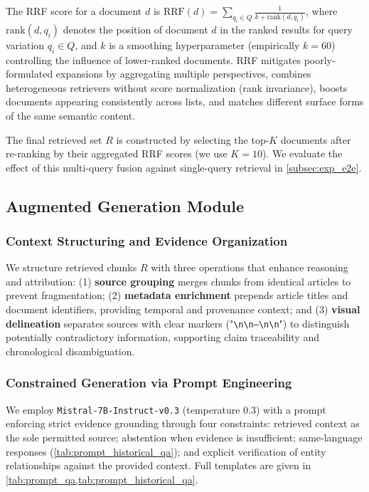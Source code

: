 \documentclass[11pt]{article}
\begin{document}
The RRF score for a document \(d\) is \(\text{RRF}(d) = \sum_{q_i \in Q} \frac{1}{k + \text{rank}(d, q_i)}\), where \(\text{rank}(d, q_i)\) denotes the position of document \(d\) in the ranked results for query variation \(q_i \in Q\), and \(k\) is a smoothing hyperparameter (empirically \(k = 60\)) controlling the influence of lower-ranked documents. RRF mitigates poorly-formulated expansions by aggregating multiple perspectives, combines heterogeneous retrievers without score normalization (rank invariance), boosts documents appearing consistently across lists, and matches different surface forms of the same semantic content.

The final retrieved set \(R\) is constructed by selecting the top-\(K\) documents after re-ranking by their aggregated RRF scores (we use \(K=10\)). We evaluate the effect of this multi-query fusion against single-query retrieval in \cref{subsec:exp_e2e}.

\subsection{Augmented Generation Module}
\label{subsec:generation}

\subsubsection{Context Structuring and Evidence Organization}
We structure retrieved chunks \(R\) with three operations that enhance reasoning and attribution: (1) \textbf{source grouping} merges chunks from identical articles to prevent fragmentation; (2) \textbf{metadata enrichment} prepends article titles and document identifiers, providing temporal and provenance context; and (3) \textbf{visual delineation} separates sources with clear markers ("\texttt{\textbackslash n\textbackslash n---\textbackslash n\textbackslash n}") to distinguish potentially contradictory information, supporting claim traceability and chronological disambiguation.

\subsubsection{Constrained Generation via Prompt Engineering}
We employ \texttt{Mistral-7B-Instruct-v0.3} (temperature 0.3) with a prompt enforcing strict evidence grounding through four constraints: retrieved context as the sole permitted source; abstention when evidence is insufficient; same-language responses (\cref{tab:prompt_historical_qa}); and explicit verification of entity relationships against the provided context. Full templates are given in \cref{tab:prompt_qa,tab:prompt_historical_qa}.
\end{document}
